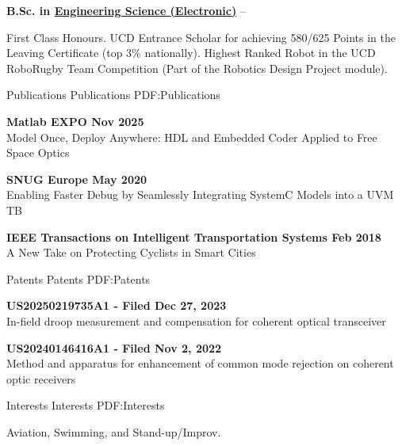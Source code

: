 \documentclass[letterpaper,MMMyyyy,nonstopmode]{simpleresumecv}
\begin{document}
\begin{Body}
\Gap
\BulletItem
\textbf{
B.Sc. in
\href{https://www.ucd.ie/eacollege/}
{Engineering Science (Electronic)}}
\hfill
{} --
\begin{Detail}
\Gap
\SubBulletItem
First Class Honours.
\SubBulletItem
UCD Entrance Scholar for achieving 580/625 Points in the Leaving Certificate (top 3\% nationally).
\SubBulletItem
Highest Ranked Robot in the UCD RoboRugby Team Competition (Part of the Robotics Design Project module).

\end{Detail}


\Section
{Publications}
{Publications}
{PDF:Publications}

\Entry
\textbf{Matlab EXPO Nov 2025} \\Model Once, Deploy Anywhere: HDL and Embedded Coder Applied to Free Space Optics

\Gap
\textbf{SNUG Europe May 2020} \\Enabling Faster Debug by Seamlessly Integrating SystemC Models into a UVM TB
 
\Gap
\textbf{IEEE Transactions on Intelligent Transportation Systems Feb 2018} \\A New Take on Protecting Cyclists in Smart Cities


\Section
{Patents}
{Patents}
{PDF:Patents}

\Entry
\textbf{US20250219735A1 - Filed Dec 27, 2023} \\In-field droop measurement and compensation for coherent optical transceiver

\Gap
\textbf{US20240146416A1 - Filed Nov 2, 2022} \\Method and apparatus for enhancement of common mode rejection on coherent optic receivers


\Section
{Interests}
{Interests}
{PDF:Interests}

\Entry
Aviation, Swimming, and Stand-up/Improv.

\end{Body}
\end{document}
